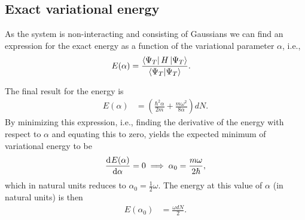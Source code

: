 \documentclass[
    a4paper, aps, twocolumn, floatfix, superscriptaddress, nofootinbib]{revtex4-1}
\newcommand{\1}{\mathds{1}}
\newcommand{\half}{\frac{1}{2}}
\begin{document}
    \subsection{Exact variational energy}
        As the system is non-interacting and consisting of Gaussians we can
        find an expression for the exact energy as a function of the
        variational parameter $\alpha$, i.e.,
        \begin{align}
            E(\alpha)
            &=
            \frac{\bra{\Psi_T}H\ket{\Psi_T}}{\bra{\Psi_T}\ket{\Psi_T}}.
        \end{align}

        The final result for the energy is
        \begin{align}
            E(\alpha)
            &=
            \left(
                \frac{\hbar^2 \alpha}{2m}
                + \frac{m\omega^2}{8\alpha}
            \right)dN.
            \label{eq:exact_energy}
        \end{align}
        By minimizing this expression, i.e., finding the derivative of the
        energy with respect to $\alpha$ and equating this to zero, yields the
        expected minimum of variational energy to be
        \begin{align}
            \dod[]{E(\alpha)}{\alpha} = 0
            \implies
            \alpha_0 = \frac{m\omega}{2\hbar},
        \end{align}
        which in natural units reduces to $\alpha_0 = \half\omega$. The energy at
        this value of $\alpha$ (in natural units) is then
        \begin{align}
            E(\alpha_0)
            &=
            \frac{\omega dN}{2}.
        \end{align}
\end{document}
